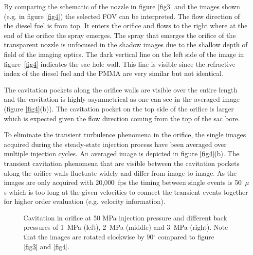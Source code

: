 \documentclass[letterpaper,twocolumn,10pt]{ilass}
\begin{document}
By comparing the schematic of the nozzle in figure \ref{fig3} and the images shown
(e.g. in figure \ref{fig4}) the selected FOV can be interpreted. The flow direction of the
diesel fuel is from top. It enters the orifice and flows to the right where at the end of the
orifice the spray emerges.
%
The spray that emerges the orifice of the transparent nozzle is unfocused in the shadow images
due to the shallow depth of field of the imaging optics. The dark vertical line on the left side of the image in figure~\ref{fig4} indicates the sac hole wall.
This line is visible since the refractive index of the diesel fuel and the PMMA are
very similar but not identical.

The cavitation pockets along the orifice walls are visible over the entire length and the cavitation is highly asymmetrical as one can see in the averaged image (figure \ref{fig4}(b)). The cavitation pocket on the top side of the orifice is larger which
is expected given the flow direction coming from the top of the sac bore.
%

To eliminate the transient turbulence phenomena in the orifice, the single images
acquired during the steady-state injection process have been averaged over multiple injection cycles. An averaged image is depicted in figure \ref{fig4}(b).
%
The transient cavitation phenomena that are visible between the cavitation pockets along the
orifice walls fluctuate widely and differ from image to image.  As the images are only
acquired with 20,000~fps the timing between single events is 50~$\mu$s which is too long at
the given velocities to connect the transient events together for higher order evaluation
(e.g. velocity information).
%

\begin{figure}[h]
\begin{center}
\end{center}
\vspace*{-2mm}
\caption{Cavitation in orifice at 50 MPa injection pressure and different back pressures of
         1~MPa (left), 2~MPa (middle) and 3~MPa (right). Note that the images are
				 rotated clockwise by 90$^{\circ}$ compared to figure \ref{fig3} and \ref{fig4}.}
\label{fig5} 
\end{figure}
\end{document}

